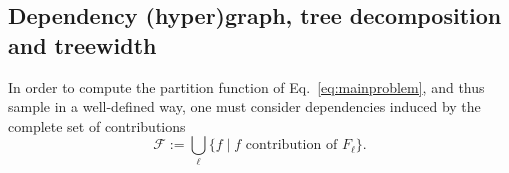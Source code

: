 \documentclass[]{bmcart}
\newcommand{\dep}{\operatorname{dep}}
\newcommand{\B}{\mathcal{B}}
\newcommand{\F}{\mathcal{F}}
\newcommand{\R}{\mathcal{R}}
\newcommand{\EbpSym}{E^{\textrm{bp}}}
\newcommand{\Def}[1]{\emph{#1}}
\newcommand{\Nuc}[1]{{\sf #1}}
\newcommand{\Ab}{\Nuc{A}}
\newcommand{\Cb}{\Nuc{C}}
\newcommand{\Gb}{\Nuc{G}}
\newcommand{\Ub}{\Nuc{U}}
\newcommand{\citep}[1]{\cite{#1}}
\newcommand{\revised}[1]{{\color{red} #1}}
\begin{document}

\subsection*{Dependency (hyper)graph, tree decomposition and treewidth}




\revised{In order to compute the partition function of Eq.~\ref{eq:mainproblem}, and thus sample in a well-defined way, one must consider dependencies induced by the complete set of contributions $$\F := \bigcup_{\ell}\{f\mid f\text{ contribution of } F_\ell\}.$$}

%
%
\end{document}
